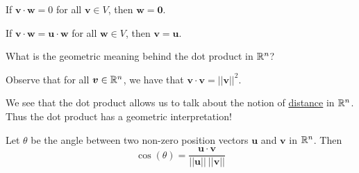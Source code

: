     \begin{proposition}\label{dotproduniqueness}
    If $\bm{v} \cdot \bm{w} = 0$ for all $\bm{v} \in V$, then $\bm{w} = \bm{0}$.
    \end{proposition}
    
    
    \begin{corollary}
    If $ \bm{v} \cdot \bm{w} = \bm{u} \cdot \bm{w}$ for all $\bm{w} \in V$, then $\bm{v} = \bm{u}$.
    \end{corollary}

\begin{motivating}
What is the geometric meaning behind the dot product in $\mathbb{R}^n$?
\end{motivating}


\begin{proposition}
    Observe that for all $\bm{v} \in \mathbb{R}^n$, we have that $\bm{v} \cdot \bm{v} = ||\bm{v}||^2$. 
\end{proposition}
    
    We see that the dot product allows us to talk about the notion of \underline{distance} in $\mathbb{R}^n$.  Thus the dot product has a geometric interpretation!
    
\begin{proposition}\label{geometricdotproduct}
    Let $\theta$ be the angle between two non-zero position vectors $\bm{u}$ and $\bm{v}$ in $\mathbb{R}^n$.  Then  $$\cos(\theta) = \frac{\bm{u} \cdot \bm{v}}{||\bm{u}|| \ ||\bm{v}||}$$
    \end{proposition}

